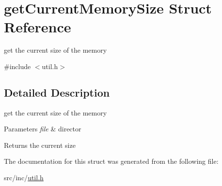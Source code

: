 \hypertarget{structget_current_memory_size}{}\section{get\+Current\+Memory\+Size Struct Reference}
\label{structget_current_memory_size}


get the current size of the memory  




{\ttfamily \#include $<$util.\+h$>$}



\subsection{Detailed Description}
get the current size of the memory 


\begin{DoxyParams}{Parameters}
{\em file} & director \\
\hline
\end{DoxyParams}
\begin{DoxyReturn}{Returns}
the current size 
\end{DoxyReturn}


The documentation for this struct was generated from the following file\+:\begin{DoxyCompactItemize}
\item 
src/inc/\mbox{\hyperlink{util_8h}{util.\+h}}\end{DoxyCompactItemize}
